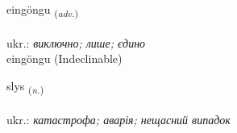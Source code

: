 \documentclass[frontgrid, backgrid]{flacards}\usepackage[]{graphicx}\usepackage[]{xcolor}
\begin{document}
\renewcommand{\blhead}{\vskip5pt {\small\bfseries\footnotesize Atviksorð | прислівник }}
\renewcommand{\bcfoot}{\vskip5pt \hspace{2pt}{\small\bfseries\footnotesize 1K}}


{eingöngu \small{\textsubscript{(\textit{adv.})}} \\[1ex]
\textphonetic{[eiŋkœiŋkʏ]} \\
ukr.: \emph{виключно; лише; єдино} \\  [2ex]
eingöngu (Indeclinable)}

\renewcommand{\flhead}{\vskip5pt \fboxsep=0pt {\small\bfseries\footnotesize Nafnorð | іменник}}
\renewcommand{\fcfoot}{\vskip5pt \fboxsep=0pt \hspace{2pt}{\small\bfseries\footnotesize 1K}}

\renewcommand{\blhead}{\vskip5pt {\small\bfseries\footnotesize Nafnorð | іменник }}
\renewcommand{\bcfoot}{\vskip5pt \hspace{2pt}{\small\bfseries\footnotesize 1K}}


{slys \small{\textsubscript{(\textit{n.})}} \\[1ex] %
\textphonetic{[stlɪːs]} \\
ukr.: \emph{катастрофа; аварія; нещасний випадок} \\  [2ex]
\renewcommand*{\arraystretch}{0.8}
}

\renewcommand{\flhead}{\vskip5pt \fboxsep=0pt {\small\bfseries\footnotesize Lýsingarorð | прикметник}}
\renewcommand{\fcfoot}{\vskip5pt \fboxsep=0pt \hspace{2pt}{\small\bfseries\footnotesize 1K}}

\renewcommand{\blhead}{\vskip5pt {\small\bfseries\footnotesize Lýsingarorð | прикметник }}
\renewcommand{\bcfoot}{\vskip5pt \hspace{2pt}{\small\bfseries\footnotesize 1K}}
\end{document}
